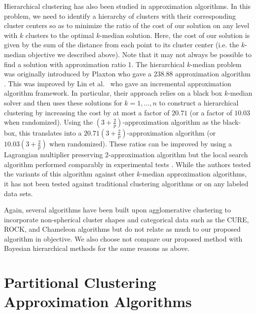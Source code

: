 \documentclass{article}
\begin{document}
Hierarchical clustering has also been studied in approximation algorithms. In this problem, we need to identify a hierarchy of clusters with their corresponding cluster centers so as to minimize the ratio of the cost of our solution on any level with $k$ clusters to the optimal $k$-median solution. Here, the cost of our solution is given by the sum of the distance from each point to its cluster center (i.e. the $k$-median objective we described above). Note that it may not always be possible to find a solution with approximation ratio 1. The hierarchical $k$-median problem was originally introduced by Plaxton who gave a 238.88 approximation algorithm \cite{Plaxton}. This was improved by Lin et al.~\cite{Lin} who gave an incremental approximation algorithm framework. In particular, their approach relies on a black box $k$-median solver and then uses these solutions for $k=1, \ldots, n$ to construct a hierarchical clustering by increasing the cost by at most a factor of $20.71$ (or a factor of $10.03$ when randomized). Using the $(3+\frac{2}{p})$-approximation algorithm as the black-box, this translates into a $20.71 (3+\frac{2}{p})$-approximation algorithm (or $10.03 (3+\frac{2}{p})$ when randomized). These ratios can be improved by using a Lagrangian multiplier preserving $2$-approximation algorithm but the local search algorithm performed comparably in experimental tests \cite{Nagarajan}. While the authors tested the variants of this algorithm against other $k$-median approximation algorithms, it has not been tested against traditional clustering algorithms or on any labeled data sets. 

Again, several algorithms have been built upon agglomerative clustering to incorporate non-spherical cluster shapes and categorical data such as the CURE, ROCK, and Chameleon algorithms \cite{Guha_CURE, Guha_ROCK, Karypis} but do not relate as much to our proposed algorithm in objective. We also choose not compare our proposed method with Bayesian hierarchical methods for the same reasons as above. 

\section{Partitional Clustering Approximation Algorithms}
\end{document}

